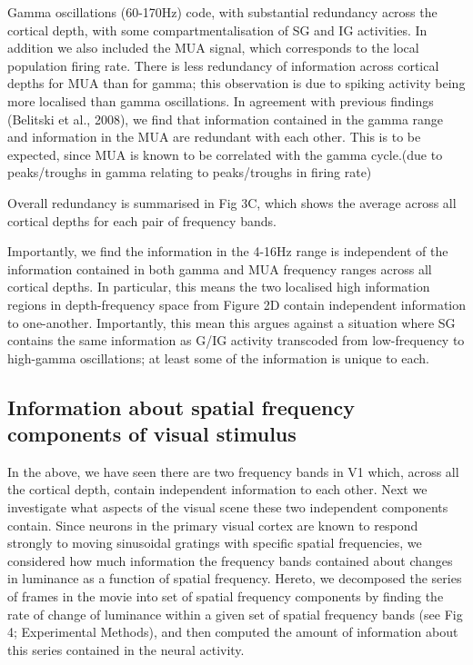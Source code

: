 Gamma oscillations (60-170Hz) code, with substantial redundancy across the cortical depth, with some compartmentalisation of \ac{SG} and \ac{IG} activities.
In addition we also included the \ac{MUA} signal, which corresponds to the local population firing rate.
There is less redundancy of information across cortical depths for \ac{MUA} than for gamma; this observation is due to spiking activity being more localised than gamma oscillations.
In agreement with previous findings (Belitski et al., 2008), we find that information contained in the gamma range and information in the \ac{MUA} are redundant with each other.
This is to be expected, since \ac{MUA} is known to be correlated with the gamma cycle.(due to peaks/troughs in gamma relating to peaks/troughs in firing rate)

Overall redundancy is summarised in Fig 3C, which shows the average across all cortical depths for each pair of frequency bands.

Importantly, we find the information in the 4-16Hz range is independent of the information contained in both gamma and \ac{MUA} frequency ranges across all cortical depths.
In particular, this means the two localised high information regions in depth-frequency space from Figure 2D contain independent information to one-another.
Importantly, this mean this argues against a situation where \ac{SG} contains the same information as \ac{G}/\ac{IG} activity transcoded from low-frequency to high-gamma oscillations; at least some of the information is unique to each.

\subsection{Information about spatial frequency components of visual stimulus}
In the above, we have seen there are two frequency bands in \ac{V1} which, across all the cortical depth, contain independent information to each other.
Next we investigate what aspects of the visual scene these two independent components contain.
Since neurons in the primary visual cortex are known to respond strongly to moving sinusoidal gratings with specific spatial frequencies, we considered how much information the frequency bands contained about changes in luminance as a function of spatial frequency.
Hereto, we decomposed the series of frames in the movie into set of spatial frequency components by finding the rate of change of luminance within a given set of spatial frequency bands (see Fig 4; Experimental Methods), and then computed the amount of information about this series contained in the neural activity.

